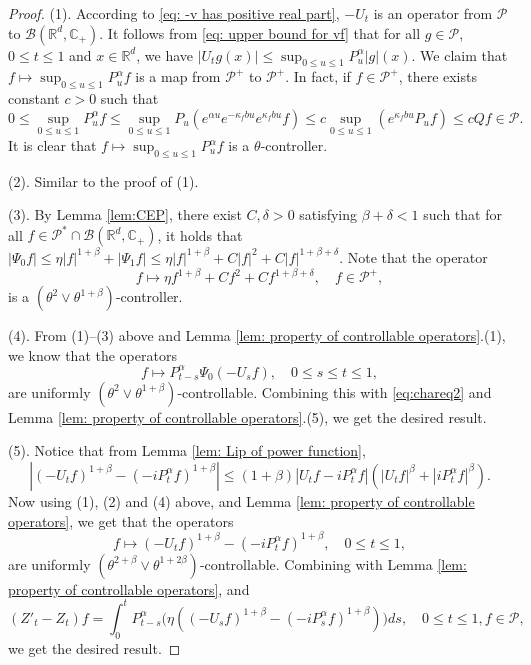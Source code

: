 \documentclass[EJP]{ejpecp} %
\begin{document}
\begin{proof}
	(1). According to \eqref{eq: -v has positive real part}, $-U_t$ is an operator from $\mathcal P$ to $\mathcal B(\mathbb R^d, \mathbb C_+)$.
  	It follows from \eqref{eq: upper bound for vf} that for all $g\in \mathcal P$, $0\leq t\leq 1$ and $x\in \mathbb R^d$, we have $ |U_t g(x)| \leq \sup_{0\leq u\leq 1}P_u^\alpha |g| (x). $
  	We claim that $f\mapsto\sup_{0\leq u\leq 1}P^{\alpha}_u f$ is a map from $\mathcal P^+$ to $\mathcal P^+$. In fact, if $f\in \mathcal P^+$, there exists constant $c>0$ such that
\[
    0
    \leq \sup_{0\leq u\leq 1}P^{\alpha}_u f
    \leq \sup_{0\leq u\leq 1} P_u (e^{\alpha u} e^{-\kappa_f b u} e^{\kappa_f b u} f )
    \leq c \sup_{0\leq u\leq 1} (e^{\kappa_f b u}P_u f) \leq c Qf \in \mathcal P.
\]
	It is clear that $f\mapsto\sup_{0\leq u\leq 1}P^{\alpha}_u f$ is a $\theta$-controller.

 	(2). Similar to the proof of (1).

  	(3). By Lemma \ref{lem:CEP}, there exist $C, \delta >0$ satisfying $\beta+\delta< 1$ such that for all $ f \in \mathcal P^* \cap \mathcal B( \mathbb R^d, \mathbb C_+ )$, it holds that $ |\Psi_0 f| \leq \eta |f|^{1+\beta} + |\Psi_1 f| \leq \eta |f|^{1+\beta} + C|f|^2+ C |f|^{1+\beta + \delta}.$
  	Note that the operator
\[
    f \mapsto \eta f^{1+\beta} + Cf^2+ Cf^{1+\beta + \delta}, 
    \quad f\in \mathcal P^+,
\]
  	is a $(\theta^2 \vee \theta^{1+\beta})$-controller.

  	(4). From (1)--(3) above and Lemma \ref{lem: property of controllable operators}.(1), we know that the operators
\[
    f \mapsto P^\alpha_{t-s}\Psi_0(-U_sf), 
    \quad 0\leq s\leq t\leq 1,
\]
  	are uniformly $(\theta^2\vee \theta^{1+\beta})$-controllable.
  	Combining this with \eqref{eq:chareq2} and
  	Lemma \ref{lem: property of controllable operators}.(5), we get the desired result.

  	(5). Notice that from Lemma \ref{lem: Lip of power function},
\[
    |(-U_t f)^{1+\beta} - (-iP^\alpha_t f)^{1+\beta} |
    \leq  (1+\beta) |U_t f-iP^\alpha_t f|(|U_t f|^{\beta}+|i P^\alpha_t f|^{\beta}).
\]
  	Now using (1), (2) and (4) above, and Lemma \ref{lem: property of controllable operators}, we get that the operators
\[
    f 
    \mapsto (-U_t f)^{1+\beta} - (-iP^\alpha_t f)^{1+\beta},
    \quad 0\leq t\leq 1,
\]
  are uniformly $(\theta^{2+\beta}\vee \theta^{1+2\beta})$-controllable.
  Combining with Lemma \ref{lem: property of controllable operators}, and
\[
    (Z'_t - Z_t)f
       = \int_0^t P^\alpha_{t-s}\Big( \eta ((-U_s f)^{1+\beta} - (-iP_s^\alpha f)^{1+\beta} )\Big)ds, 
    \quad 0\leq t\leq 1, f\in \mathcal P,
\]
  	we get the desired result.
	

\end{proof}
\end{document}
